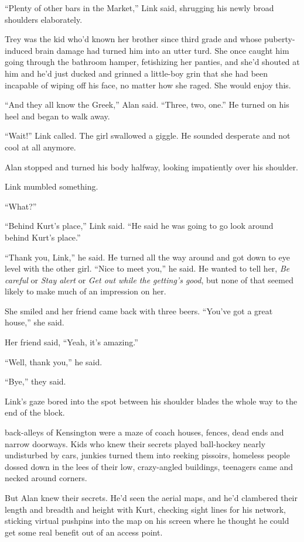 ``Plenty of other bars in the Market,'' Link said, shrugging his newly
broad shoulders elaborately.

Trey was the kid who'd known her brother since third grade and whose
puberty-induced brain damage had turned him into an utter turd.  She
once caught him going through the bathroom hamper, fetishizing her
panties, and she'd shouted at him and he'd just ducked and grinned a
little-boy grin that she had been incapable of wiping off his face, no
matter how she raged.  She would enjoy this.

``And they all know the Greek,'' Alan said.  ``Three, two, one.'' He
turned on his heel and began to walk away.

``Wait!'' Link called.  The girl swallowed a giggle.  He sounded
desperate and not cool at all anymore.

Alan stopped and turned his body halfway, looking impatiently over his
shoulder.

Link mumbled something.

``What?''

``Behind Kurt's place,'' Link said.  ``He said he was going to go look
around behind Kurt's place.''

``Thank you, Link,'' he said.  He turned all the way around and got
down to eye level with the other girl.  ``Nice to meet you,'' he said. 
He wanted to tell her, \textit{Be careful} or \textit{Stay alert} or
\textit{Get out while the getting's good}, but none of that seemed
likely to make much of an impression on her.

She smiled and her friend came back with three beers.  ``You've got a
great house,'' she said.

Her friend said, ``Yeah, it's amazing.''

``Well, thank you,'' he said.

``Bye,'' they said.

Link's gaze bored into the spot between his shoulder blades the whole
way to the end of the block.

 back-alleys of Kensington were a maze of coach houses, fences,
dead ends and narrow doorways.  Kids who knew their secrets played
ball-hockey nearly undisturbed by cars, junkies turned them into
reeking pissoirs, homeless people dossed down in the lees of their
low, crazy-angled buildings, teenagers came and necked around corners.

But Alan knew their secrets.  He'd seen the aerial maps, and he'd
clambered their length and breadth and height with Kurt, checking
sight lines for his network, sticking virtual pushpins into the map on
his screen where he thought he could get some real benefit out of an
access point.

